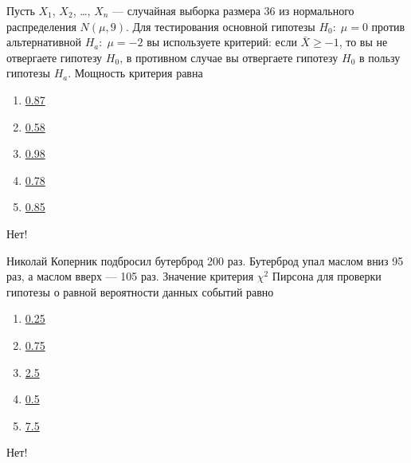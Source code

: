 \documentclass[t]{beamer}
\begin{document}
 \begin{frame} \label{14-No} 
\begin{block}{14} 

Пусть $X_1$, $X_2$, \ldots, $X_n$ — случайная выборка размера 36 из нормального распределения $N(\mu, 9)$. Для тестирования основной гипотезы  $H_0: \; \mu=0$  против альтернативной $H_a: \; \mu=-2$   вы используете критерий: если  $\bar{X}\geq -1$, то вы не отвергаете гипотезу $H_0$, в противном случае вы отвергаете гипотезу  $H_0$ в пользу гипотезы  $H_a$. Мощность критерия равна
 


 \end{block} 
\begin{enumerate} 
\item[] \hyperlink{14-No}{\beamergotobutton{} 0.87}
\item[] \hyperlink{14-No}{\beamergotobutton{} 0.58}
\item[] \hyperlink{14-Yes}{\beamergotobutton{} 0.98}
\item[] \hyperlink{14-No}{\beamergotobutton{} 0.78}
\item[] \hyperlink{14-No}{\beamergotobutton{} 0.85}
\end{enumerate} 

 \alert{Нет!} 
\end{frame} 


 \begin{frame} \label{15-No} 
\begin{block}{15} 

Николай Коперник подбросил бутерброд 200 раз. Бутерброд упал маслом вниз 95 раз, а маслом вверх — 105 раз. Значение критерия $\chi^2$ Пирсона для проверки гипотезы о равной вероятности данных событий равно
 


 \end{block} 
\begin{enumerate} 
\item[] \hyperlink{15-No}{\beamergotobutton{} 0.25}
\item[] \hyperlink{15-No}{\beamergotobutton{} 0.75}
\item[] \hyperlink{15-No}{\beamergotobutton{} 2.5}
\item[] \hyperlink{15-Yes}{\beamergotobutton{} 0.5}
\item[] \hyperlink{15-No}{\beamergotobutton{} 7.5}
\end{enumerate} 

 \alert{Нет!} 
\end{frame} 
\end{document}
